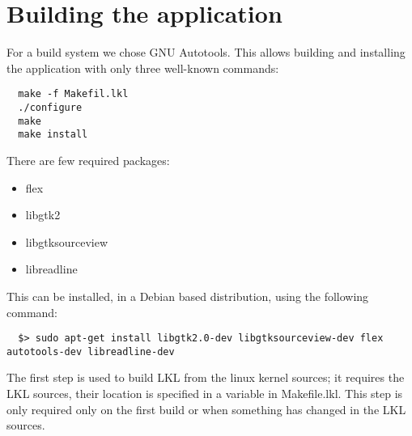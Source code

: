 \chapter{Building the application}


For a build system we chose GNU Autotools. This allows building
and installing the application with only three well-known commands:

\lstset{language=bash,caption=Build System,label=lst:building}
\begin{lstlisting}
  make -f Makefil.lkl
  ./configure
  make
  make install
\end{lstlisting}

There are few required packages:
\begin{itemize}
  \item flex
  \item libgtk2
  \item libgtksourceview
  \item libreadline
\end{itemize}

This can be installed, in a Debian based distribution, using the following 
command:
\lstset{language=zsh,caption=Required packages,label=lst:bpacakges}
\begin{lstlisting}
  $> sudo apt-get install libgtk2.0-dev libgtksourceview-dev flex autotools-dev libreadline-dev
\end{lstlisting}

The first step is used to build LKL from the linux kernel sources; it
requires the LKL sources, their location is specified in a variable in
Makefile.lkl. This step is only required only on the first build or
when something has changed in the LKL sources.
